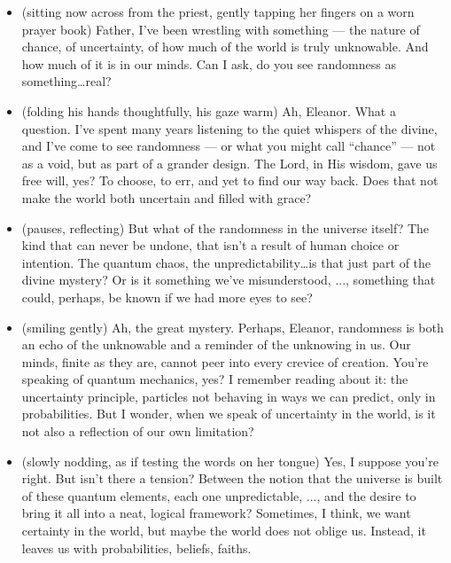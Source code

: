 \begin{itemize}[leftmargin=2cm,labelsep=1em]

  \item[\textbf{Eleanor :}] 
  (sitting now across from the priest, gently tapping her fingers on a worn prayer book) Father, I’ve been wrestling with something --- the nature of chance, of uncertainty, of how much of the world is truly unknowable. 
  And how much of it is in our minds. Can I ask, do you see randomness as something\ldots real?

  \item[\textbf{Priest :}] (folding his hands thoughtfully, his gaze warm)
  Ah, Eleanor. What a question. I’ve spent many years listening to the quiet whispers of the divine, 
  and I’ve come to see randomness --- or what you might call ``chance'' --- not as a void, but as part of a grander design. 
  The Lord, in His wisdom, gave us free will, yes? To choose, to err, and yet to find our way back. 
  Does that not make the world both uncertain and filled with grace?

  \item[\textbf{Eleanor :}] (pauses, reflecting) 
  But what of the randomness in the universe itself? The kind that can never be undone, that isn't a result of human choice or intention. 
  The quantum chaos, the unpredictability\ldots is that just part of the divine mystery? 
  Or is it something we’ve misunderstood, ...,  something that could, perhaps, be known if we had more eyes to see?

  \item[\textbf{Priest :}] (smiling gently)
  Ah, the great mystery. Perhaps, Eleanor, randomness is both an echo of the unknowable and a reminder of the unknowing in us. 
  Our minds, finite as they are, cannot peer into every crevice of creation. 
  You’re speaking of quantum mechanics, yes? 
  I remember reading about it: the uncertainty principle, particles not behaving in ways we can predict, only in probabilities. 
  But I wonder, when we speak of uncertainty in the world, is it not also a reflection of our own limitation?

  \item[\textbf{Eleanor :}] (slowly nodding, as if testing the words on her tongue)
  Yes, I suppose you’re right. But isn’t there a tension? Between the notion that the universe is built of these quantum elements, 
  each one unpredictable, ..., and the desire to bring it all into a neat, logical framework? 
  Sometimes, I think, we want certainty in the world, but maybe the world does not oblige us. 
  Instead, it leaves us with probabilities, beliefs, faiths.


\end{itemize}
